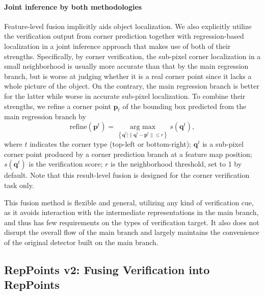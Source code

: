 \documentclass{article}
\begin{document}
\paragraph{Joint inference by both methodologies} Feature-level fusion implicitly aids object localization. We also explicitly utilize the verification output from corner prediction together with regression-based localization in a joint inference approach that makes use of both of their strengths. Specifically, by corner verification, the sub-pixel corner localization in a small neighborhood is usually more accurate than that by the main regression branch, but is worse at judging whether it is a real corner point since it lacks a whole picture of the object. On the contrary, the main regression branch is better for the latter while worse in accurate sub-pixel localization. To combine their strengths, we refine a corner point $\mathbf{p}_t$ of the bounding box predicted from the main regression branch by
\begin{equation}
   \text{refine}(\mathbf{p}^t) = \mathop{\text{arg max}}\limits_{\left\{ \mathbf{q}^t\big| \|\mathbf{q}^t-\mathbf{p}^t\|\leq r\right\}} s(\mathbf{q}^t),  
\end{equation}
where $t$ indicates the corner type (top-left or bottom-right); $\mathbf{q}^t$ is a sub-pixel corner point produced by a corner prediction branch at a feature map position; $s(\mathbf{q}^t)$ is the verification score; $r$ is the neighborhood threshold, set to 1 by default. Note that this result-level fusion is designed for the corner verification task only.

This fusion method is flexible and general, utilizing any kind of verification cue, as it avoids interaction with the intermediate representations in the main branch, and thus has few requirements on the types of verification target. It also does not disrupt the overall flow of the main branch and largely maintains the convenience of the original detector built on the main branch.

\subsection{RepPoints v2: Fusing Verification into RepPoints} \label{sec:repptsv2}
\end{document}
